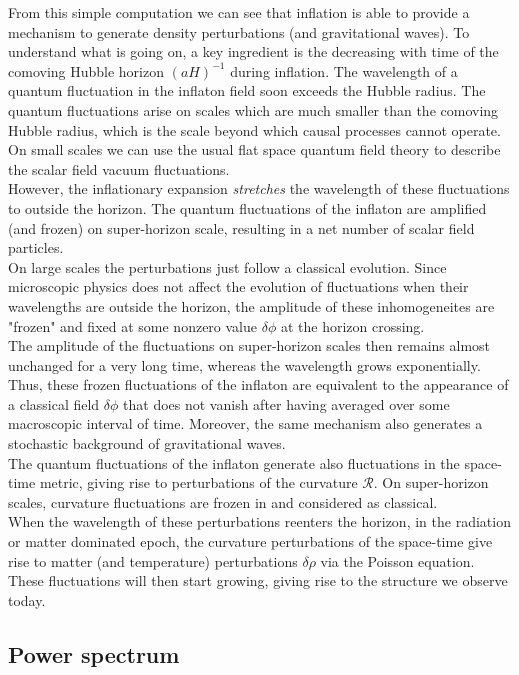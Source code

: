 \documentclass[11pt,a4paper,twoside]{book}
\begin{document}
From this simple computation we can see that inflation is able to provide a mechanism to generate density perturbations (and gravitational waves). To understand what is going on, a key ingredient is the decreasing with time of the comoving Hubble horizon $ (aH)^{-1} $ during inflation. The wavelength of a quantum fluctuation in the inflaton field soon exceeds the Hubble radius. The quantum fluctuations arise on scales which are much smaller than the comoving Hubble radius, which is the scale beyond which causal processes cannot operate. On small scales we can use the usual flat space quantum field theory to describe the scalar field vacuum fluctuations.\\
However, the inflationary expansion \textit{stretches} the wavelength of these fluctuations to outside the horizon. The quantum fluctuations of the inflaton are amplified (and frozen) on super-horizon scale, resulting in a net number of scalar field particles.\\
On large scales the perturbations just follow a classical evolution. Since microscopic physics does not affect the evolution of fluctuations when their wavelengths are outside the horizon, the amplitude of these inhomogeneites are "frozen" and fixed at some nonzero value $ \delta\phi $ at the horizon crossing.\\
The amplitude of the fluctuations on super-horizon scales then remains almost unchanged for a very long time, whereas the wavelength grows exponentially. Thus, these frozen fluctuations of the inflaton are equivalent to the appearance of a classical field $ \delta\phi $ that does not vanish after having averaged over some macroscopic interval of time. Moreover, the same mechanism also generates a stochastic background of gravitational waves.\\
The quantum fluctuations of the inflaton generate also fluctuations in the space-time metric, giving rise to perturbations of the curvature $ \mathcal{R} $. On super-horizon scales, curvature fluctuations are frozen in and considered as classical.\\
When the wavelength of these perturbations reenters the horizon, in the radiation or matter dominated epoch, the curvature perturbations of the space-time give rise to matter (and temperature) perturbations $ \delta \rho $ via the Poisson equation.\\
These fluctuations will then start growing, giving rise to the structure we observe today.

\subsection{Power spectrum}
\end{document}
